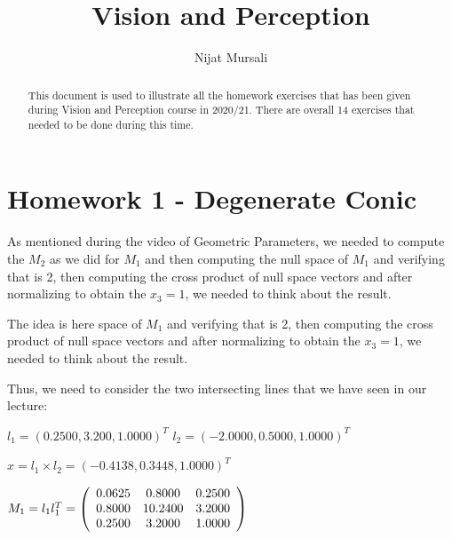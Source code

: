 \documentclass[]{article}
\title{Vision and Perception}
\author{Nijat Mursali}
\begin{document}
\maketitle

\begin{abstract}
	This document is used to illustrate all the homework exercises that has been given during Vision and Perception course in 2020/21. There are overall 14 exercises that needed to be done during this time. 


\end{abstract}

\section{Homework 1 - Degenerate Conic}
As mentioned during the video of Geometric Parameters, we needed to compute the $M_{2}$ as we did for $M_{1}$ and then computing the null space of $M_{1}$ and verifying that is 2, then computing the cross product of null space vectors and after normalizing to obtain the $x_{3} = 1$, we needed to think about the result.
\vspace{0.4em}

The idea is here space of $M_{1}$ and verifying that is 2, then computing the cross product of null space vectors and after normalizing to obtain the $x_{3} = 1$, we needed to think about the result.	


Thus, we need to consider the two intersecting lines that we have seen in our lecture: 

\centerline {
$l_{1} = (0.2500, 3.200, 1.0000)^T$  
$l_{2} = (-2.0000, 0.5000, 1.0000)^T$ 
}

\centerline {
	$x = l_{1} \times l_{2} = (-0.4138, 0.3448, 1.0000)^T$
}

\vspace{0.5em}

\centerline {
$M_{1} = l_{1}l_{1}^T = 
\left( {\begin{array}{*{20}c}
	0.0625 & 0.8000 & 0.2500 \\
	0.8000 & 10.2400 & 3.2000 \\
	0.2500 &  3.2000 & 1.0000   
	\end{array} } \right)$
}
\end{document}
